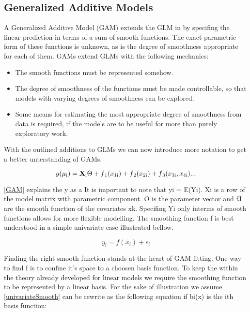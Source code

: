 \documentclass{article}
\begin{document}
    \subsection{Generalized Additive Models}
    A Generalized Additive Model (GAM) extends the GLM in by specifing the linear prediction in terms of a sum of smooth functions. The exact parametric form of these functions is unknown, as is the degree of smoothness appropriate for each of them. GAMs extend GLMs with the following mechanics:
    \begin{itemize}
        \item The smooth functions must be represented somehow.
        \item The degree of smoothness of the functions must be made controllable, so that models with varying degrees of smoothness can be explored.
        \item Some means for estimating the most appropriate degree of smoothness from data is required, if the models are to be useful for more than purely exploratory work.
    \end{itemize}
    With the outlined additions to GLMs we can now introduce more notation to get a better unterstanding of GAMs.

    \begin{equation} \label{GAM} g(\mu\textsubscript{i}) = \mathbf{X} \textsubscript{i} \Theta + f\textsubscript{1}(x\textsubscript{1i}) + f\textsubscript{2}(x\textsubscript{2i}) + f\textsubscript{3}(x\textsubscript{3i}, x\textsubscript{4i}) ... \end{equation}

    \ref{GAM} explains the y as a It is important to note that yi = E(Yi). Xi is a row of the model matrix with parametric component. O is the parameter vector and fJ are the smooth function of the covariates xk. Specifing Yi only interms of smooth functions allows for more flexible modelling. The smoothing function f is best understood in a simple univariate case illustrated bellow.

    \begin{equation} \label{univariateSmooth} y_i = f(x_i) + \epsilon_i \end{equation}

    Finding the right smooth function stands at the heart of GAM fitting. One way to find f is to confine it's space to a choosen basis function. To keep the within the theory already developed for linear models we require the smoothing function to be represented by a linear basis. For the sake of illustration we assume \ref{univariateSmooth} can be rewrite as the following equation if bi(x) is the ith basis function:
\end{document}
